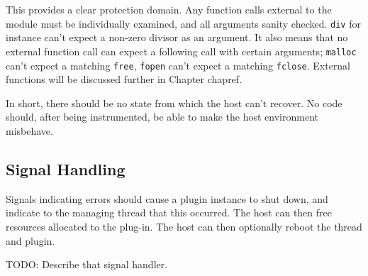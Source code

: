 This provides a clear protection domain.
Any function calls external to the module must be individually examined, and all
arguments sanity checked.
\texttt{div} for instance can't expect a non-zero divisor as an argument.
It also means that no external function call can expect a following call with
certain arguments; \texttt{malloc} can't expect a matching \texttt{free},
\texttt{fopen} can't expect a matching \texttt{fclose}. External functions will
be discussed further in Chapter {chapref}. 

In short, there should be no state from which the host can't recover. No code
should, after being instrumented, be able to make the host environment
misbehave.

\subsection {Signal Handling}

Signals indicating errors should cause a plugin instance to shut down, and
indicate to the managing thread that this occurred. The host can then free
resources allocated to the plug-in. The host can then optionally reboot the
thread and plugin.

TODO: Describe that signal handler.

